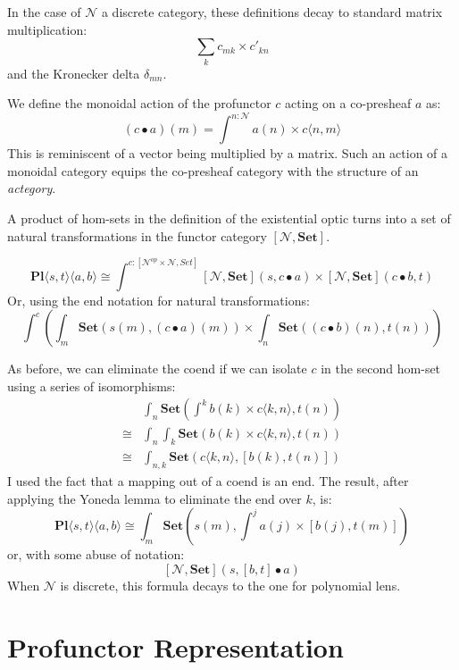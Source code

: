\documentclass[11pt]{amsart}
\begin{document}
In the case of $\mathcal{N}$ a discrete category, these definitions decay to standard matrix multiplication: 
\[ \sum_k c_{m k} \times c'_{k n} \]
and the Kronecker delta $\delta_{m n}$.

We define the monoidal action of the profunctor $c$ acting on a co-presheaf $a$ as:
\[(c \bullet a) (m) = \int^{n \colon \mathcal{N}} a(n) \times c \langle n, m \rangle \]
This is reminiscent of a vector being multiplied by a matrix. Such an action of a monoidal category equips the co-presheaf category with the structure of an \emph{actegory}. 

A product of hom-sets in the definition of the existential optic turns into a set of natural transformations in the functor category $ [\mathcal{N}, \mathbf{Set}] $. 

\[ \mathbf{Pl}\langle s, t\rangle \langle a, b\rangle \cong \int^{c \colon [\mathcal{N}^{op} \times \mathcal{N}, Set]}   [\mathcal{N}, \mathbf{Set}]  \left(s, c \bullet a\right)  \times  [\mathcal{N}, \mathbf{Set}]  \left(c \bullet b, t\right) \]
Or, using the end notation for natural transformations:
\[ \int^{c} \left( \int_m \mathbf{Set}\left(s(m), (c \bullet a)(m)\right)  \times  \int_n \mathbf{Set} \left((c \bullet b)(n), t(n)\right) \right)\]

As before, we can eliminate the coend if we can isolate $c$ in the second hom-set using a series of isomorphisms:
\begin{align*}
 & \int_n  \mathbf{Set} \left(\int^k b(k) \times c\langle k, n \rangle , t(n) \right)
 \\
\cong & \int_n \int_k \mathbf{Set}\left( b(k) \times c\langle k, n \rangle , t (n)\right)
 \\
\cong &  \int_{n, k} \mathbf{Set}\left(c\langle k, n \rangle , [b(k), t (n)]\right)
 \end{align*}
I used the fact that a mapping out of a coend is an end. The result, after applying the Yoneda lemma to eliminate the end over $k$, is:
\[ \mathbf{Pl}\langle s, t\rangle \langle a, b\rangle \cong  
\int_m \mathbf{Set}\left(s(m), \int^j a(j) \times [b(j), t(m)] \right) \]
or, with some abuse of notation:
\[  [\mathcal{N}, \mathbf{Set}] ( s, [b, t] \bullet a)\]
When $\mathcal{N}$ is discrete, this formula decays to the one for polynomial lens. 

\section{Profunctor Representation}
\end{document}
